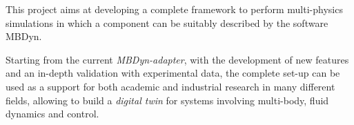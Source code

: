 This project aims at developing a complete framework to perform multi-physics simulations in which a component can be suitably described by the software MBDyn.  

Starting from the current \textit{MBDyn-adapter}, with the development of new features and an in-depth validation with experimental data, the complete set-up can be used as a support for both academic and industrial research in many different fields, allowing to build a \textit{digital twin} for systems involving multi-body, fluid dynamics and control.